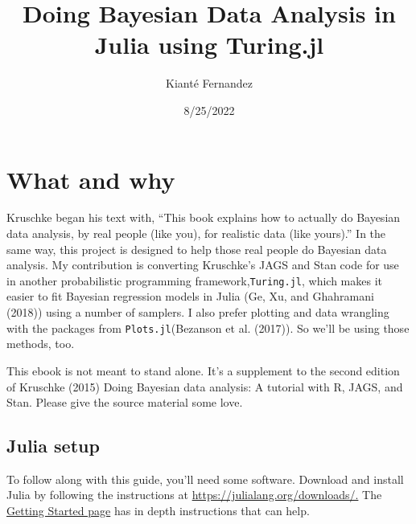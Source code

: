 \documentclass[
  letterpaper,
  DIV=11,
  numbers=noendperiod]{scrreprt}
\title{Doing Bayesian Data Analysis in Julia using Turing.jl}
\author{Kianté Fernandez}
\date{8/25/2022}
\renewcommand*\contentsname{Table of contents}
\newcommand\contentsname{Table of contents}
\begin{document}
\maketitle
\ifdefined\Shaded\renewenvironment{Shaded}{\begin{tcolorbox}[interior hidden, breakable, boxrule=0pt, frame hidden, borderline west={3pt}{0pt}{shadecolor}, enhanced, sharp corners]}{\end{tcolorbox}}\fi

\renewcommand*\contentsname{Table of contents}
{
\hypersetup{linkcolor=}
\setcounter{tocdepth}{2}
\tableofcontents
}

\hypertarget{what-and-why}{%
\chapter*{What and why}\label{what-and-why}}

Kruschke began his text with, ``This book explains how to actually do
Bayesian data analysis, by real people (like you), for realistic data
(like yours).'' In the same way, this project is designed to help those
real people do Bayesian data analysis. My contribution is converting
Kruschke's JAGS and Stan code for use in another probabilistic
programming framework,\texttt{Turing.jl}, which makes it easier to fit
Bayesian regression models in Julia (Ge, Xu, and Ghahramani (2018))
using a number of samplers. I also prefer plotting and data wrangling
with the packages from \texttt{Plots.jl}(Bezanson et al. (2017)). So
we'll be using those methods, too.

This ebook is not meant to stand alone. It's a supplement to the second
edition of Kruschke (2015) Doing Bayesian data analysis: A tutorial with
R, JAGS, and Stan. Please give the source material some love.

\hypertarget{julia-setup}{%
\section*{Julia setup}\label{julia-setup}}

To follow along with this guide, you'll need some software. Download and
install Julia by following the instructions at
\href{https://julialang.org/downloads/}{https://julialang.org/downloads/.}
The
\href{https://docs.julialang.org/en/v1/manual/getting-started/}{Getting
Started page} has in depth instructions that can help.
\end{document}
